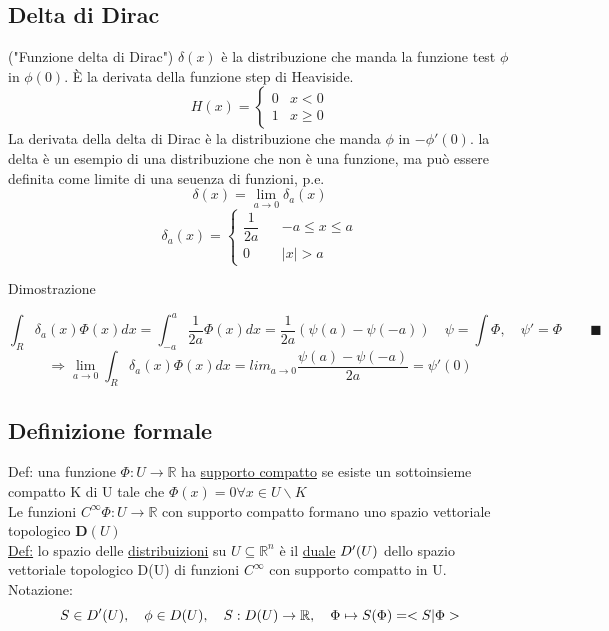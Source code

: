 \documentclass[a4paper,11pt]{report}
\begin{document}
\subsection{Delta di Dirac}
("Funzione delta di Dirac") $\delta(x)$ è la distribuzione che manda la funzione test $\phi$ in $\phi(0)$. È la derivata della funzione step di Heaviside.
$$
H\left(x\right)=\left\{ \begin{matrix}
0 & x < 0 \\
1 & x \geq 0
\end{matrix}\right. $$
La derivata della delta di Dirac è la distribuzione che manda $\phi$ in $-\phi '(0)$. la delta è un esempio di una distribuzione che non è una funzione, ma può essere definita come limite di una seuenza di funzioni, p.e.
$$ \delta\left(x\right) = \lim_{a\to 0}\delta_a\left(x\right) $$
$$ \delta_a\left(x\right) = \left\{\begin{matrix}
\dfrac{1}{2a} && -a\leq x\leq a\\
0 && |x| > a
\end{matrix}\right.$$

Dimostrazione

$$
\int_R \delta_a (x)\Phi(x) dx= \int_{-a}^{a}\dfrac{1}{2a}\Phi(x) dx = \dfrac{1}{2a}\left(\psi(a)-\psi(-a)\right)
\quad \psi= \int \Phi,\quad \psi '=\Phi \qquad\blacksquare$$
$$
\Rightarrow \lim_{a\to 0}\int_{R}\delta_a(x)\Phi(x)dx=lim_{a\to 0}\dfrac{\psi(a)-\psi(-a)}{2a}=\psi '(0)
$$

\subsection{Definizione formale}
Def: una funzione $\Phi : U \rightarrow \mathbb{R} $ ha \underline{supporto compatto} se esiste un sottoinsieme compatto K di U tale che $\Phi(x)=0 \forall x \in U\backslash K $\\
Le funzioni $ C^{\infty} \Phi :U\rightarrow \mathbb{R}$ con supporto compatto formano uno spazio vettoriale topologico $\mathbf{D}(U)$\\

\underline{Def:} lo spazio delle \underline{distribuizioni} su $U \subseteq \mathbb{R}^n$ è il \underline{duale} $D\sp\prime(U)$ dello spazio vettoriale topologico D(U) di funzioni $C^{\infty}$ con supporto compatto in U.\\

Notazione: $$S \in D\sp\prime(U), \quad
\phi \in D(U), \quad
S : D(U)\rightarrow \mathbb{R}, \quad 
	\Phi \mapsto S(\Phi) = <S|\Phi>
$$
\end{document}
